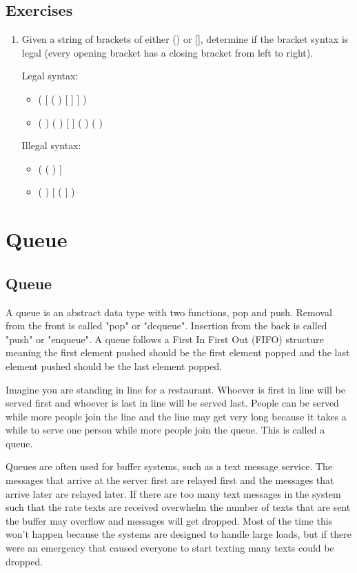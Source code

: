 \documentclass[11pt,oneside]{book}
\begin{document}
        \section{ Exercises }
        

\begin{enumerate}
\item Given a string of brackets of either () or [], determine if the bracket syntax is legal (every opening bracket has a closing bracket from left to right).

Legal syntax:

\begin{itemize}
\item ( [ ( ) [ ] ] )
\item ( ) ( ) [ ] ( ) ( )
\end{itemize}

Illegal syntax:

\begin{itemize}
\item ( ( ) ]
\item ( ) [ ( ] )
\end{itemize}
\end{enumerate}

    \chapter{ Queue }
        \section{ Queue }
        

A queue is an abstract data type with two functions, pop and push. Removal from the front is called "pop" or "dequeue". Insertion from the back is called "push" or "enqueue". A queue follows a First In First Out (FIFO) structure meaning the first element pushed should be the first element popped and the last element pushed should be the last element popped.

Imagine you are standing in line for a restaurant. Whoever is first in line will be served first and whoever is last in line will be served last. People can be served while more people join the line and the line may get very long because it takes a while to serve one person while more people join the queue. This is called a queue.

Queues are often used for buffer systems, such as a text message service. The messages that arrive at the server first are relayed first and the messages that arrive later are relayed later. If there are too many text messages in the system such that the rate  texts are received overwhelm the number of texts that are sent the buffer may overflow and messages will get dropped. Most of the time this won't happen because the systems are designed to handle large loads, but if there were an emergency that caused everyone to start texting many texts could be dropped.
\end{document}
